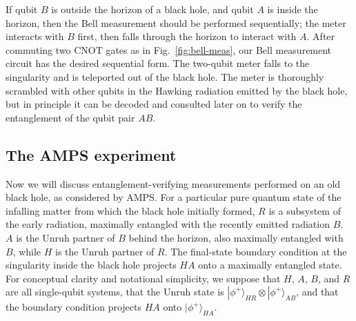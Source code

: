 \documentclass[11pt]{article}
\begin{document}
If qubit $B$ is outside the horizon of a black hole, and qubit $A$ is inside the horizon, then the Bell measurement should be performed sequentially; the meter interacts with $B$ first, then falls through the horizon to interact with $A$. After commuting two CNOT gates as in Fig.~\ref{fig:bell-meas}, our Bell measurement circuit has the desired sequential form. The two-qubit meter falls to the singularity and is teleported out of the black hole. The meter is thoroughly scrambled with other qubits in the Hawking radiation emitted by the black hole, but in principle it can be decoded and consulted later on to verify the entanglement of the qubit pair $AB$.

\subsection{The AMPS experiment}

Now we will discuss entanglement-verifying measurements performed on an old black hole, as considered by AMPS. For a particular pure quantum state of the infalling matter from which the black hole initially formed, $R$ is a subsystem of the early radiation, maximally entangled with the recently emitted radiation $B$. $A$ is the Unruh partner of $B$ behind the horizon, also maximally entangled with $B$, while $H$ is the Unruh partner of $R$. The final-state boundary condition at the singularity inside the black hole projects $HA$ onto a maximally entangled state. For conceptual clarity and notational simplicity, we suppose that $H$, $A$, $B$, and $R$ are all single-qubit systems, that the Unruh state is $|\phi^+\rangle_{HR}\otimes|\phi^+\rangle_{AB}$, and that the boundary condition projects $HA$ onto $|\phi^+\rangle_{HA}$.
\end{document}
